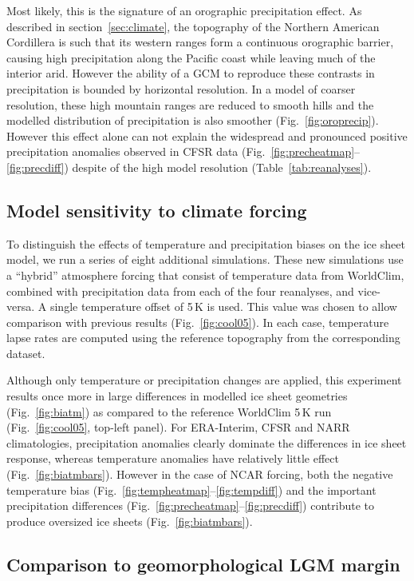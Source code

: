 Most likely, this is the signature of an orographic precipitation effect. As described in section~\ref{sec:climate}, the topography of the Northern American Cordillera is such that its western ranges form a continuous orographic barrier, causing high precipitation along the Pacific coast while leaving much of the interior arid. However the ability of a GCM to reproduce these contrasts in precipitation is bounded by horizontal resolution. In a model of coarser resolution, these high mountain ranges are reduced to smooth hills and the modelled distribution of precipitation is also smoother (Fig.~\ref{fig:oroprecip}). However this effect alone can not explain the widespread and pronounced positive precipitation anomalies observed in CFSR data (Fig.~\ref{fig:precheatmap}--\ref{fig:precdiff}) despite of the high model resolution (Table~\ref{tab:reanalyses}).

\subsection{Model sensitivity to climate forcing}

To distinguish the effects of temperature and precipitation biases on the ice sheet model, we run a series of eight additional simulations. These new simulations use a “hybrid” atmosphere forcing that consist of temperature data from WorldClim, combined with precipitation data from each of the four reanalyses, and vice-versa. A single temperature offset of 5\,K is used. This value was chosen to allow comparison with previous results (Fig.~\ref{fig:cool05}). In each case, temperature lapse rates are computed using the reference topography from the corresponding dataset.

Although only temperature or precipitation changes are applied, this experiment results once more in large differences in modelled ice sheet geometries (Fig.~\ref{fig:biatm}) as compared to the reference WorldClim 5\,K run (Fig.~\ref{fig:cool05}, top-left panel). For ERA-Interim, CFSR and NARR climatologies, precipitation anomalies clearly dominate the differences in ice sheet response, whereas temperature anomalies have relatively little effect (Fig.~\ref{fig:biatmbars}). However in the case of NCAR forcing, both the negative temperature bias (Fig.~\ref{fig:tempheatmap}--\ref{fig:tempdiff}) and the important precipitation differences (Fig.~\ref{fig:precheatmap}--\ref{fig:precdiff}) contribute to produce oversized ice sheets (Fig.~\ref{fig:biatmbars}).

\subsection{Comparison to geomorphological LGM margin}

